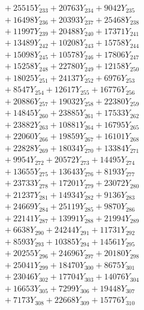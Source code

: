 \documentclass[a4paper,10pt]{article}
\begin{document}
{\begin{align}
&\;  + 25515 Y_{233} + 20763 Y_{234} + 9042 Y_{235} \\[0.3ex]
&\;  + 16498 Y_{236} + 20393 Y_{237} + 25468 Y_{238} \\[0.5ex]\allowbreak
&\;  + 11997 Y_{239} + 20488 Y_{240} + 17371 Y_{241} \\[0.3ex]
&\;  + 13489 Y_{242} + 10208 Y_{243} + 15758 Y_{244} \\[0.3ex]
&\;  + 15098 Y_{245} + 10578 Y_{246} + 17806 Y_{247} \\[0.3ex]
&\;  + 15258 Y_{248} + 22780 Y_{249} + 12158 Y_{250} \\[0.3ex]
&\;  + 18025 Y_{251} + 24137 Y_{252} + 6976 Y_{253} \\[0.3ex]
&\;  + 8547 Y_{254} + 12617 Y_{255} + 16776 Y_{256} \\[0.3ex]
&\;  + 20886 Y_{257} + 19032 Y_{258} + 22380 Y_{259} \\[0.3ex]
&\;  + 14845 Y_{260} + 23885 Y_{261} + 17533 Y_{262} \\[0.3ex]
&\;  + 23882 Y_{263} + 10881 Y_{264} + 16795 Y_{265} \\[0.3ex]
&\;  + 22060 Y_{266} + 19859 Y_{267} + 16101 Y_{268} \\[0.5ex]\allowbreak
&\;  + 22828 Y_{269} + 18034 Y_{270} + 13384 Y_{271} \\[0.3ex]
&\;  + 9954 Y_{272} + 20572 Y_{273} + 14495 Y_{274} \\[0.3ex]
&\;  + 13655 Y_{275} + 13643 Y_{276} + 8193 Y_{277} \\[0.3ex]
&\;  + 23733 Y_{278} + 17201 Y_{279} + 23072 Y_{280} \\[0.3ex]
&\;  + 21237 Y_{281} + 14934 Y_{282} + 9136 Y_{283} \\[0.3ex]
&\;  + 24669 Y_{284} + 25119 Y_{285} + 9870 Y_{286} \\[0.3ex]
&\;  + 22141 Y_{287} + 13991 Y_{288} + 21994 Y_{289} \\[0.3ex]
&\;  + 6638 Y_{290} + 24244 Y_{291} + 11731 Y_{292} \\[0.3ex]
&\;  + 8593 Y_{293} + 10385 Y_{294} + 14561 Y_{295} \\[0.3ex]
&\;  + 20255 Y_{296} + 24696 Y_{297} + 20180 Y_{298} \\[0.5ex]\allowbreak
&\;  + 25041 Y_{299} + 18470 Y_{300} + 8675 Y_{301} \\[0.3ex]
&\;  + 23046 Y_{302} + 17704 Y_{303} + 14076 Y_{304} \\[0.3ex]
&\;  + 16653 Y_{305} + 7299 Y_{306} + 19448 Y_{307} \\[0.3ex]
&\;  + 7173 Y_{308} + 22668 Y_{309} + 15776 Y_{310} \\[0.3ex]

\end{align}}
\end{document}
